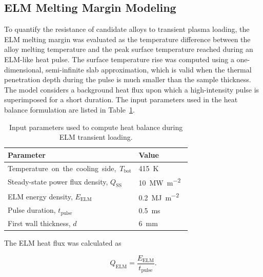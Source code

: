\subsection{ELM Melting Margin Modeling}
\label{subsec:elm-methods}

To quantify the resistance of candidate alloys to transient plasma loading, the ELM melting margin was evaluated as the temperature difference between the alloy melting temperature and the peak surface temperature reached during an ELM-like heat pulse. The surface temperature rise was computed using a one-dimensional, semi-infinite slab approximation, which is valid when the thermal penetration depth during the pulse is much smaller than the sample thickness. The model considers a background heat flux upon which a high-intensity pulse is superimposed for a short duration. The input parameters used in the heat balance formulation are listed in
Table~\ref{tab:ELM_params}.

\begin{table}[H]
\centering
\caption{Input parameters used to compute heat balance during ELM transient loading.}
\label{tab:ELM_params}
\begin{tabularx}{\columnwidth}{Xl}
\toprule
\textbf{Parameter} & \textbf{Value} \\
\midrule
\mbox{Temperature on the cooling side, $T_{\mathrm{bot}}$} & \SI{415}{\kelvin}~\cite{VandenKerkhof2021,DeTemmerman2018} \\
Steady-state power flux density, $Q_{\mathrm{SS}}$ & \SI{10}{\mega\watt\per\square\meter}~\cite{Pitts2019,VandenKerkhof2021} \\
ELM energy density, $E_{\mathrm{ELM}}$ & \SI{0.2}{\mega\joule\per\square\meter}~\cite{Farid2015} \\
Pulse duration, $t_{\mathrm{pulse}}$ & \SI{0.5}{\milli\second}~\cite{Farid2015,DeTemmerman2018} \\
First wall thickness, $d$ & \SI{6}{\milli\meter}~\cite{VandenKerkhof2021,DeTemmerman2018} \\
\bottomrule
\end{tabularx}
\end{table}


The ELM heat flux was calculated as

\vspace{0.2em}
\begin{equation}
Q_{\mathrm{ELM}}
=
\frac{E_{\mathrm{ELM}}}{t_{\mathrm{pulse}}}.
\label{eq:elm_heat_flux}
\end{equation}
\vspace{0.2em}


